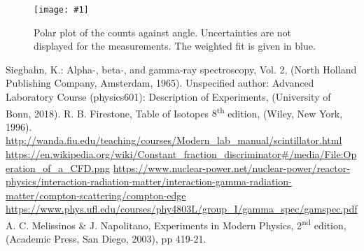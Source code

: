 \documentclass[twocolumn]{article}
\newcommand{\insertFigure}[1]{%
   \texttt{[image: \#1]}%
}
\begin{document}
\begin{figure}
	\centering
	\insertFigure{polar.png}
	\caption{Polar plot of the counts against angle. Uncertainties are not displayed for the measurements. The weighted fit is given in blue.}
	\label{fig:polar}
\end{figure}

\begin{thebibliography}{9}

Siegbahn, K.: Alpha-, beta-, and gamma-ray spectroscopy, Vol. 2, (North Holland Publishing Company, Amsterdam, 1965).
Unspecified author: Advanced Laboratory Course (physics601): Description of Experiments, (University of Bonn, 2018).
R. B. Firestone, Table of Isotopes $8$\textsuperscript{th} edition, (Wiley, New York, 1996).
 \url{http://wanda.fiu.edu/teaching/courses/Modern_lab_manual/scintillator.html}
\url{https://en.wikipedia.org/wiki/Constant_fraction_discriminator#/media/File:Operation_of_a_CFD.png}
\url{https://www.nuclear-power.net/nuclear-power/reactor-physics/interaction-radiation-matter/interaction-gamma-radiation-matter/compton-scattering/compton-edge}
\url{https://www.phys.ufl.edu/courses/phy4803L/group_I/gamma_spec/gamspec.pdf}
A. C. Melissinos $\&$ J. Napolitano, Experiments in Modern Physics, 2\textsuperscript{nd} edition, (Academic Press, San Diego, 2003), pp 419-21.
\end{thebibliography}
\end{document}
